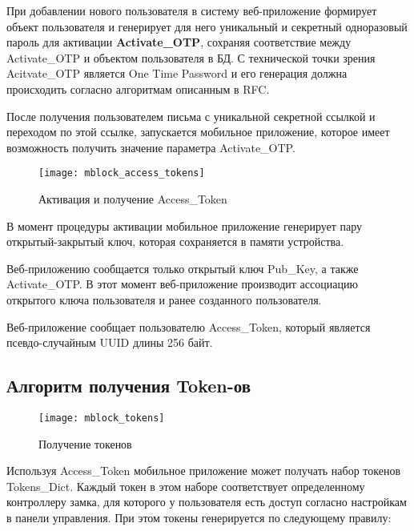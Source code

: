 При добавлении нового пользователя в систему веб-приложение формирует объект пользователя и генерирует для него уникальный и секретный одноразовый пароль для активации \textbf{Activate\_OTP}, сохраняя соответствие между Activate\_OTP и объектом пользователя в БД. С технической точки зрения Acitvate\_OTP является One Time Password и его генерация должна происходить согласно алгоритмам описанным в RFC.

После получения пользователем письма с уникальной секретной ссылкой и переходом по этой ссылке, запускается мобильное приложение, которое имеет возможность получить значение параметра Activate\_OTP. 

\begin{figure}[ht] %
	\centering
	\texttt{[image: mblock\_access\_tokens]}\\ %
	\caption{Активация и получение Access\_Token}%
	\label{mblock_access_token}%
\end{figure}

В момент процедуры активации мобильное приложение генерирует пару открытый-закрытый ключ, которая сохраняется в памяти устройства. 

Веб-приложению сообщается только открытый ключ Pub\_Key, а также Activate\_OTP. В этот момент веб-приложение производит ассоциацию открытого ключа пользователя и ранее созданного пользователя.

Веб-приложение сообщает пользователю Access\_Token, который является псевдо-случайным UUID длины 256 байт.

\subsection{Алгоритм получения Token-ов} \label{subsect2_4_2}

\begin{figure}[ht] %
	\centering
	\texttt{[image: mblock\_tokens]}\\ %
	\caption{Получение токенов}%
	\label{mblock_tokens}%
\end{figure}

Используя Access\_Token мобильное приложение может получать набор токенов Tokens\_Dict. Каждый токен в этом наборе соответствует определенному контроллеру замка, для которого у пользователя есть доступ согласно настройкам в панели управления. При этом токены генерируется по следующему правилу:

